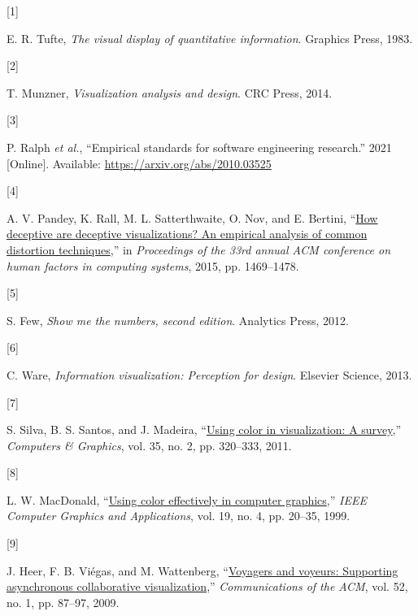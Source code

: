 \documentclass[
  10pt,
  conference,
]{IEEEtran}%
\newlength{\cslhangindent}
\newlength{\csllabelwidth}
\newenvironment{CSLReferences}[2] %
 {\begin{list}{}{%
  \setlength{\itemindent}{0pt}
  \setlength{\leftmargin}{0pt}
  \setlength{\parsep}{0pt}
  \ifodd #1
   \setlength{\leftmargin}{\cslhangindent}
   \setlength{\itemindent}{-1\cslhangindent}
  \fi
  \setlength{\itemsep}{#2\baselineskip}}}
 {\end{list}}
\newcommand{\CSLLeftMargin}[1]{\parbox[t]{\csllabelwidth}{\strut#1\strut}}
\newcommand{\CSLRightInline}[1]{\parbox[t]{\linewidth - \csllabelwidth}{\strut#1\strut}}
\begin{document}
\label{refs}
\begin{CSLReferences}{0}{0}
\CSLLeftMargin{{[}1{]} }%
\CSLRightInline{E. R. Tufte, \emph{The visual display of quantitative
information}. Graphics Press, 1983. }

\CSLLeftMargin{{[}2{]} }%
\CSLRightInline{T. Munzner, \emph{Visualization analysis and design}.
CRC Press, 2014. }

\CSLLeftMargin{{[}3{]} }%
\CSLRightInline{P. Ralph \emph{et al.}, {``Empirical standards for
software engineering research.''} 2021 {[}Online{]}. Available:
\url{https://arxiv.org/abs/2010.03525}}

\CSLLeftMargin{{[}4{]} }%
\CSLRightInline{A. V. Pandey, K. Rall, M. L. Satterthwaite, O. Nov, and
E. Bertini, {``\href{https://doi.org/10.1145/2702123.2702608}{How
deceptive are deceptive visualizations? An empirical analysis of common
distortion techniques},''} in \emph{Proceedings of the 33rd annual ACM
conference on human factors in computing systems}, 2015, pp. 1469--1478.
}

\CSLLeftMargin{{[}5{]} }%
\CSLRightInline{S. Few, \emph{Show me the numbers, second edition}.
Analytics Press, 2012. }

\CSLLeftMargin{{[}6{]} }%
\CSLRightInline{C. Ware, \emph{Information visualization: Perception for
design}. Elsevier Science, 2013. }

\CSLLeftMargin{{[}7{]} }%
\CSLRightInline{S. Silva, B. S. Santos, and J. Madeira,
{``\href{https://doi.org/10.1016/j.cag.2010.11.015}{Using color in
visualization: A survey},''} \emph{Computers \& Graphics}, vol. 35, no.
2, pp. 320--333, 2011. }

\CSLLeftMargin{{[}8{]} }%
\CSLRightInline{L. W. MacDonald,
{``\href{https://doi.org/10.1109/38.773961}{Using color effectively in
computer graphics},''} \emph{IEEE Computer Graphics and Applications},
vol. 19, no. 4, pp. 20--35, 1999. }

\CSLLeftMargin{{[}9{]} }%
\CSLRightInline{J. Heer, F. B. Viégas, and M. Wattenberg,
{``\href{https://doi.org/10.1145/1435417.1435439}{Voyagers and voyeurs:
Supporting asynchronous collaborative visualization},''}
\emph{Communications of the ACM}, vol. 52, no. 1, pp. 87--97, 2009. }


\end{CSLReferences}
\end{document}
